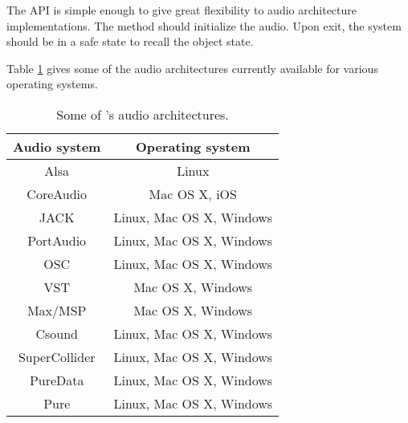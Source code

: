 The API is simple enough to give great flexibility to audio architecture implementations. The  method should initialize the audio. Upon  exit, the system should be in a safe state to recall the  object state.

Table \ref{tab:aarch} gives some of the audio architectures currently available for various operating systems.
\begin{table}[htp]
\begin{center}
\begin{tabular}{|c|c|}
\hline
\bf{Audio system} & \bf{Operating system} \\
\hline
Alsa  & Linux \\
CoreAudio 		& Mac OS X, iOS \\
JACK 			& Linux, Mac OS X, Windows \\
PortAudio 			& Linux, Mac OS X, Windows \\
OSC				& Linux, Mac OS X, Windows \\
VST				& Mac OS X, Windows \\
Max/MSP			& Mac OS X, Windows \\
Csound			& Linux, Mac OS X, Windows \\
SuperCollider		& Linux, Mac OS X, Windows \\
PureData			& Linux, Mac OS X, Windows \\
Pure 			& Linux, Mac OS X, Windows \\
\hline
\end{tabular}
\end{center}
\caption{Some of \faust's audio architectures.}
\label{tab:aarch}
\end{table}%
 

